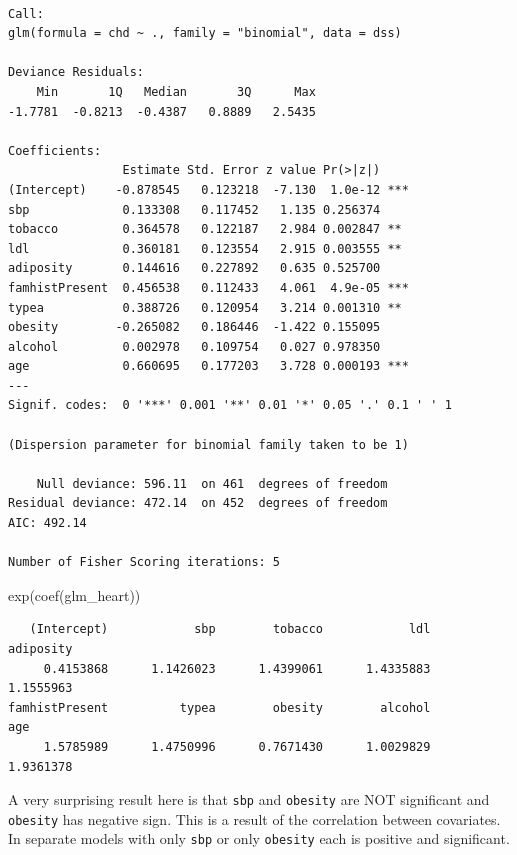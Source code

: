 \documentclass[
  letterpaper,
  DIV=11,
  numbers=noendperiod]{scrartcl}
\newenvironment{Shaded}{\begin{snugshade}}{\end{snugshade}}
\newcommand{\FunctionTok}[1]{\textcolor[rgb]{0.28,0.35,0.67}{#1}}
\newcommand{\NormalTok}[1]{\textcolor[rgb]{0.00,0.23,0.31}{#1}}
\begin{document}
\begin{verbatim}

Call:
glm(formula = chd ~ ., family = "binomial", data = dss)

Deviance Residuals: 
    Min       1Q   Median       3Q      Max  
-1.7781  -0.8213  -0.4387   0.8889   2.5435  

Coefficients:
                Estimate Std. Error z value Pr(>|z|)    
(Intercept)    -0.878545   0.123218  -7.130  1.0e-12 ***
sbp             0.133308   0.117452   1.135 0.256374    
tobacco         0.364578   0.122187   2.984 0.002847 ** 
ldl             0.360181   0.123554   2.915 0.003555 ** 
adiposity       0.144616   0.227892   0.635 0.525700    
famhistPresent  0.456538   0.112433   4.061  4.9e-05 ***
typea           0.388726   0.120954   3.214 0.001310 ** 
obesity        -0.265082   0.186446  -1.422 0.155095    
alcohol         0.002978   0.109754   0.027 0.978350    
age             0.660695   0.177203   3.728 0.000193 ***
---
Signif. codes:  0 '***' 0.001 '**' 0.01 '*' 0.05 '.' 0.1 ' ' 1

(Dispersion parameter for binomial family taken to be 1)

    Null deviance: 596.11  on 461  degrees of freedom
Residual deviance: 472.14  on 452  degrees of freedom
AIC: 492.14

Number of Fisher Scoring iterations: 5
\end{verbatim}

\begin{Shaded}
\begin{Highlighting}[]
\FunctionTok{exp}\NormalTok{(}\FunctionTok{coef}\NormalTok{(glm\_heart))}
\end{Highlighting}
\end{Shaded}

\begin{verbatim}
   (Intercept)            sbp        tobacco            ldl      adiposity 
     0.4153868      1.1426023      1.4399061      1.4335883      1.1555963 
famhistPresent          typea        obesity        alcohol            age 
     1.5785989      1.4750996      0.7671430      1.0029829      1.9361378 
\end{verbatim}

A very surprising result here is that \texttt{sbp} and \texttt{obesity}
are NOT significant and \texttt{obesity} has negative sign. This is a
result of the correlation between covariates. In separate models with
only \texttt{sbp} or only \texttt{obesity} each is positive and
significant.
\end{document}
